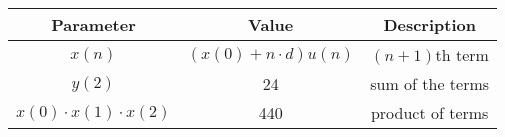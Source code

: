 \begin{tabular}{|c|c|c|}
    \hline
    \textbf{Parameter} & \textbf{Value} & \textbf{Description} \\
    \hline
    $x(n)$  & $\left(x(0) + n \cdot d\right) u(n)$ & $(n+1)$th term \\ 
    \hline
    $y(2)$  & 24 & sum of the terms \\
    \hline
    $x(0)\cdot x(1)\cdot x(2)$  & 440 & product of terms \\
    \hline
\end{tabular}



